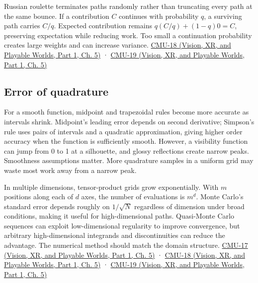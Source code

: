 Russian roulette terminates paths randomly rather than truncating every path at the same bounce. If a contribution \(C\) continues with probability \(q\), a surviving path carries \(C/q\). Expected contribution remains \(q(C/q)+(1-q)0=C\), preserving expectation while reducing work. Too small a continuation probability creates large weights and can increase variance. \href{../07-Vision-XR-and-Playable-Worlds-P01/main.pdf\#nameddest=04-visual-computing-ii-ch036-cmu-18---monte-carlo-rendering}{CMU-18 (Vision, XR, and Playable Worlds, Part 1, Ch. 5)} · \href{../07-Vision-XR-and-Playable-Worlds-P01/main.pdf\#nameddest=04-visual-computing-ii-ch036-cmu-19---variance-reduction}{CMU-19 (Vision, XR, and Playable Worlds, Part 1, Ch. 5)}

\subsection{Error of quadrature}\label{03-visual-computing-i-ch012-error-of-quadrature}

\hypertarget{03-visual-computing-i-ch012-error-of-quadrature}{}

For a smooth function, midpoint and trapezoidal rules become more accurate as intervals shrink. Midpoint's leading error depends on second derivative; Simpson's rule uses pairs of intervals and a quadratic approximation, giving higher order accuracy when the function is sufficiently smooth. However, a visibility function can jump from 0 to 1 at a silhouette, and glossy reflections create narrow peaks. Smoothness assumptions matter. More quadrature samples in a uniform grid may waste most work away from a narrow peak.

In multiple dimensions, tensor-product grids grow exponentially. With \(m\) positions along each of \(d\) axes, the number of evaluations is \(m^d\). Monte Carlo's standard error depends roughly on \(1/\sqrt{N}\) regardless of dimension under broad conditions, making it useful for high-dimensional paths. Quasi-Monte Carlo sequences can exploit low-dimensional regularity to improve convergence, but arbitrary high-dimensional integrands and discontinuities can reduce the advantage. The numerical method should match the domain structure. \href{../07-Vision-XR-and-Playable-Worlds-P01/main.pdf\#nameddest=04-visual-computing-ii-ch036-cmu-17---numerical-integration}{CMU-17 (Vision, XR, and Playable Worlds, Part 1, Ch. 5)} · \href{../07-Vision-XR-and-Playable-Worlds-P01/main.pdf\#nameddest=04-visual-computing-ii-ch036-cmu-18---monte-carlo-rendering}{CMU-18 (Vision, XR, and Playable Worlds, Part 1, Ch. 5)} · \href{../07-Vision-XR-and-Playable-Worlds-P01/main.pdf\#nameddest=04-visual-computing-ii-ch036-cmu-19---variance-reduction}{CMU-19 (Vision, XR, and Playable Worlds, Part 1, Ch. 5)}

